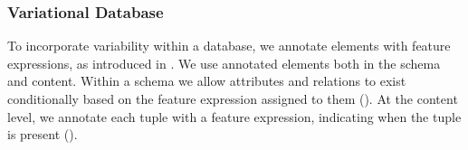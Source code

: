 \subsubsection{Variational Database}
\label{sec:vdb}

To incorporate variability within a database, we annotate elements with feature expressions,
as introduced in . We use annotated elements both in the schema and content.
Within a schema we allow attributes and relations to exist 
conditionally based on the feature expression assigned to them ().
At the content level, we annotate each tuple with a feature expression, indicating when the tuple 
is present (). 





